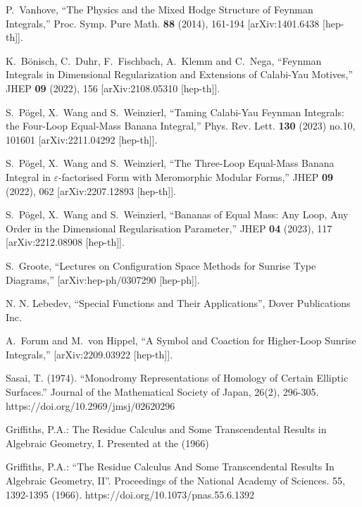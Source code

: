 \documentclass[a4paper,12pt]{article}
\numberwithin{equation}{section}
\numberwithin{figure}{section}
\begin{document}
\begin{thebibliography}{99}
  
P.~Vanhove,
``The Physics and the Mixed Hodge Structure of Feynman Integrals,''
Proc. Symp. Pure Math. \textbf{88} (2014), 161-194
[arXiv:1401.6438 [hep-th]].


K.~B\"onisch, C.~Duhr, F.~Fischbach, A.~Klemm and C.~Nega,
``Feynman Integrals in Dimensional Regularization and Extensions of Calabi-Yau Motives,''
JHEP \textbf{09} (2022), 156
[arXiv:2108.05310 [hep-th]].


S.~P\"ogel, X.~Wang and S.~Weinzierl,
``Taming Calabi-Yau Feynman Integrals: the Four-Loop Equal-Mass Banana Integral,''
Phys. Rev. Lett. \textbf{130} (2023) no.10, 101601
[arXiv:2211.04292 [hep-th]].

S.~P\"ogel, X.~Wang and S.~Weinzierl,
``The Three-Loop Equal-Mass Banana Integral in \ensuremath{\varepsilon}-factorised Form with Meromorphic Modular Forms,''
JHEP \textbf{09} (2022), 062
[arXiv:2207.12893 [hep-th]].

S.~P\"ogel, X.~Wang and S.~Weinzierl,
``Bananas of Equal Mass: Any Loop, Any Order in the Dimensional Regularisation Parameter,''
JHEP \textbf{04} (2023), 117
[arXiv:2212.08908 [hep-th]].

S.~Groote,
``Lectures on Configuration Space Methods for Sunrise Type Diagrams,''
[arXiv:hep-ph/0307290 [hep-ph]].
  
 N. N. Lebedev, ``Special Functions and Their
  Applications'', Dover Publications Inc. 

A.~Forum and M.~von Hippel,
``A Symbol and Coaction for Higher-Loop Sunrise Integrals,''
[arXiv:2209.03922 [hep-th]].

 Sasai, T. (1974). ``Monodromy Representations of
  Homology of Certain Elliptic Surfaces.'' Journal of the Mathematical
  Society of Japan, 26(2),
  296-305. https://doi.org/10.2969/jmsj/02620296

   Griffiths, P.A.: The Residue Calculus and Some
    Transcendental Results in Algebraic Geometry, I. Presented at the
    (1966)

    Griffiths, P.A.: ``The Residue Calculus And Some Transcendental
    Results In Algebraic Geometry, II''. Proceedings of the National
    Academy of Sciences. 55, 1392-1395
    (1966). https://doi.org/10.1073/pnas.55.6.1392 
  

\end{thebibliography}
\end{document}
